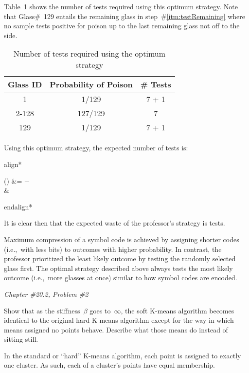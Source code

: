 \documentclass{report}
\newenvironment{aligncustom}
{ \csname align*\endcsname %
    \centering
}
{
  \csname endalign*\endcsname
}
\newcounter{subProbCount}       %
\newenvironment{problemshell}{
  \par%
  \medskip
  \leftskip=0pt\rightskip=0pt%
}
{
  \par\medskip
  \setcounter{subProbCount}{1} %
}
\newenvironment{problem}[3]
{%
  \begin{problemshell}
    \noindent \textit{Chapter \##1.#2, Problem \##3} \\
    \bfseries
}
{
  \end{problemshell}
}
\begin{document}
  Table~\ref{tab:problem5.9.20-Opt} shows the number of tests required using this optimum strategy.    Note that Glass\#~129 entails the remaining glass in step~\#\ref{itm:testRemaining} where no sample tests positive for poison up to the last remaining glass not off to the side.

  \begin{table}[h]
    \centering
    \begin{tabular}{c|c|c}
      \hline
      Glass ID & Probability of Poison & \# Tests  \\\hline
      1        & 1/129                 & 7 + 1     \\\hline
      2-128    & 127/129               & 7         \\\hline
      129      & 1/129                 & 7 + 1     \\\hline
    \end{tabular}
    \caption{Number of tests required using the optimum strategy}\label{tab:problem5.9.20-Opt}
  \end{table}

  \noindent
  Using this optimum strategy, the expected number of tests is:

  \begin{aligncustom}
    () &=   +   \\
    &\approx {}
  \end{aligncustom}

  It is clear then that the expected waste of the professor's strategy is  tests.

  Maximum compression of a symbol code is achieved by assigning shorter codes (i.e.,~with less bits) to outcomes with higher probability.  In contrast, the professor prioritized the least likely outcome by testing the randomly selected glass first.  The optimal strategy described above always tests the most likely outcome (i.e.,~more glasses at once) similar to how symbol codes are encoded.


  \newpage
  \begin{problem}{20}{2}{2}
    Show that as the stiffness~$\beta$ goes to~$\infty$, the soft K-means algorithm becomes identical to the original hard K-means algorithm except for the way in which means assigned no points behave.  Describe what those means do instead of sitting still.
  \end{problem}

  In the standard or ``hard'' K-means algorithm, each point is assigned to exactly one cluster.  As such, each of a cluster's points have equal membership.
\end{document}
